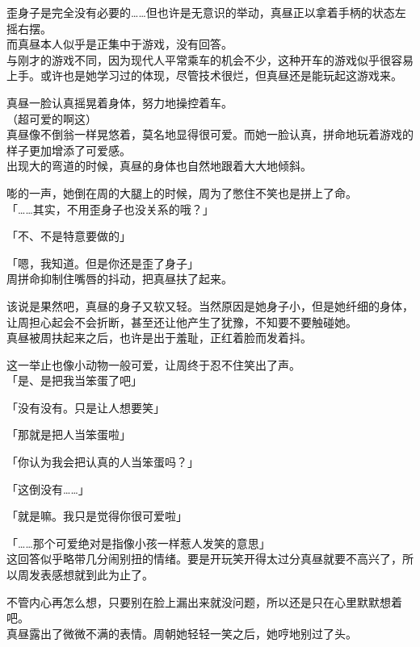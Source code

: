 歪身子是完全没有必要的……但也许是无意识的举动，真昼正以拿着手柄的状态左摇右摆。\\

而真昼本人似乎是正集中于游戏，没有回答。\\

与刚才的游戏不同，因为现代人平常乘车的机会不少，这种开车的游戏似乎很容易上手。或许也是她学习过的体现，尽管技术很烂，但真昼还是能玩起这游戏来。

真昼一脸认真摇晃着身体，努力地操控着车。\\

（超可爱的啊这）\\

真昼像不倒翁一样晃悠着，莫名地显得很可爱。而她一脸认真，拼命地玩着游戏的样子更加增添了可爱感。\\

出现大的弯道的时候，真昼的身体也自然地跟着大大地倾斜。

嘭的一声，她倒在周的大腿上的时候，周为了憋住不笑也是拼上了命。\\

「……其实，不用歪身子也没关系的哦？」

「不、不是特意要做的」

「嗯，我知道。但是你还是歪了身子」\\

周拼命抑制住嘴唇的抖动，把真昼扶了起来。

该说是果然吧，真昼的身子又软又轻。当然原因是她身子小，但是她纤细的身体，让周担心起会不会折断，甚至还让他产生了犹豫，不知要不要触碰她。\\

真昼被周扶起来之后，也许是出于羞耻，正红着脸而发着抖。

这一举止也像小动物一般可爱，让周终于忍不住笑出了声。\\

「是、是把我当笨蛋了吧」

「没有没有。只是让人想要笑」

「那就是把人当笨蛋啦」

「你认为我会把认真的人当笨蛋吗？」

「这倒没有……」

「就是嘛。我只是觉得你很可爱啦」

「……那个可爱绝对是指像小孩一样惹人发笑的意思」\\

这回答似乎略带几分闹别扭的情绪。要是开玩笑开得太过分真昼就要不高兴了，所以周发表感想就到此为止了。

不管内心再怎么想，只要别在脸上漏出来就没问题，所以还是只在心里默默想着吧。\\

真昼露出了微微不满的表情。周朝她轻轻一笑之后，她哼地别过了头。

